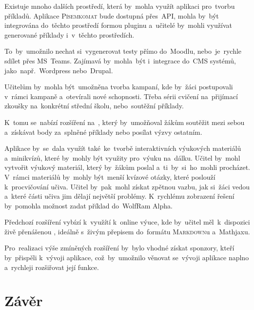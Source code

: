 \documentclass[14pt,a4paper]{article}
\begin{document}
        Existuje mnoho dalších prostředí, která by~mohla využít aplikaci pro~tvorbu příkladů. Aplikace \textsc{Písemkomat} bude dostupná přes~\textsc{API}, mohla by~být integrována do~těchto prostředí formou pluginu a~učitelé by~mohli využívat generované příklady i~v~těchto prostředích.
        
        To~by~umožnilo nechat si~vygenerovat testy přímo do~Moodlu, nebo~je~rychle sdílet přes MS~Teams. Zajímavá by~mohla~být i~integrace do~\textsc{CMS} systémů, jako~např.~Wordpress nebo~Drupal.

        Učitelům by~mohla být~umožněna tvorba kampaní, kde by~žáci postupovali v~rámci kampaně a~otevírali nové schopnosti. Třeba sérii cvičení na~přijímací zkoušky na~konkrétní střední školu, nebo~soutěžní příklady.
        
        K~tomu se~nabízí rozšíření na~, který by~umožňoval žákům soutěžit mezi sebou a~získávat body za~splněné příklady nebo posílat výzvy ostatním.

        Aplikace by~se~dala využít také~ke~tvorbě interaktivních výukových materiálů a~minikvízů, které by~mohly být využity pro~výuku na~dálku. Učitel by~mohl vytvořit výukový materiál, který by~žákům poslal a~ti~by~si~ho~mohli procházet. V~rámci materiálů by~mohly být~menší kvízové otázky, které poslouží k~procvičování učiva. Učitel by~pak~mohl získat zpětnou vazbu, jak si~žáci vedou a~které části učiva jim dělají největší problémy. K~rychlému zobrazení řešení by~pomohla možnost zadat příklad do~WolfRam Alpha. 
        
        Předchozí rozšíření vybízí k~využítí k~online výuce, kde by~učitel měl~k~dispozici živě přenášenou , ideálně s~živým přepisem do~formátu \textsc{Markdown}u a~Mathjaxu.

        Pro~realizaci výše zmíněných rozšíření by~bylo vhodné získat sponzory, kteří by~přispěli k~vývoji aplikace, což~by~umožnilo věnovat se~vývoji aplikace naplno a~rychleji rozšiřovat její funkce.
	
	\section{Závěr}

    \newpage
    \printbibliography
\end{document}
